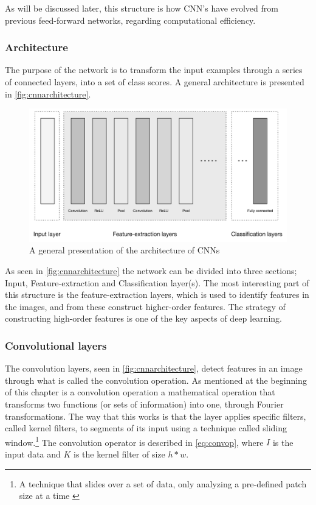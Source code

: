 As will be discussed later, this structure is how CNN's have evolved from previous feed-forward networks, regarding computational efficiency.

\subsubsection{Architecture}
The purpose of the network is to transform the input examples through a series of connected layers, into a set of class scores. A general architecture is presented in \autoref{fig:cnnarchitecture}.

\begin{figure}[!h]
	\centering
	\includegraphics[scale=0.6]{fig/cnn_architecture.png}
	\caption{A general presentation of the architecture of CNNs \cite{Patterson2017}}
	\label{fig:cnnarchitecture}
\end{figure}

As seen in \autoref{fig:cnnarchitecture} the network can be divided into three sections; Input, Feature-extraction and Classification layer(s). The most interesting part of this structure is the feature-extraction layers, which is used to identify features in the images, and from these construct higher-order features. The strategy of constructing high-order features is one of the key aspects of deep learning.


\subsubsection{Convolutional layers}
The convolution layers, seen in \autoref{fig:cnnarchitecture}, detect features in an image through what is called the convolution operation. As mentioned at the beginning of this chapter is a convolution operation a mathematical operation that transforms two functions (or sets of information) into one, through Fourier transformations. The way that this works is that the layer applies specific filters, called kernel filters, to segments of its input using a technique called sliding window.\footnote{ A technique that slides over a set of data, only analyzing a pre-defined patch size at a time \cite{Stanford2017}} The convolution operator is described in  \autoref{eq:convop}, where $I$ is the input data and $K$ is the kernel filter of size $h*w$.

